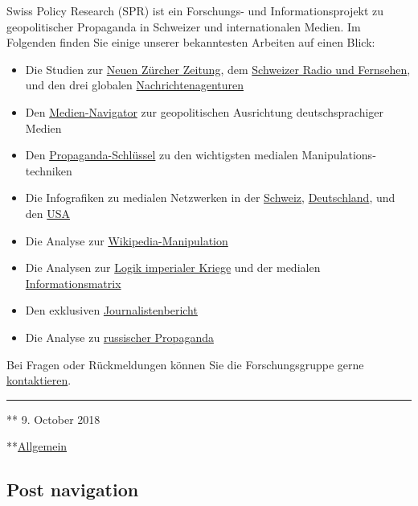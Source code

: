 Swiss Policy Research (SPR) ist ein Forschungs- und Informationsprojekt
zu geopolitischer Propaganda in Schweizer und internationalen Medien. Im
Folgenden finden Sie einige unserer bekanntesten Arbeiten auf einen
Blick:

\begin{itemize}
\tightlist
\item
  Die Studien zur \href{https://swprs.org/die-nzz-studie/}{Neuen Zürcher
  Zeitung}, dem
  \href{https://swprs.org/srf-propaganda-analyse/}{Schweizer Radio und
  Fernsehen}, und den drei globalen
  \href{https://swprs.org/der-propaganda-multiplikator/}{Nachrichtenagenturen}
\item
  Den \href{https://swprs.org/medien-navigator/}{Medien-Navigator} zur
  geopolitischen Ausrichtung deutschsprachiger Medien
\item
  Den
  \href{https://swprs.org/der-propaganda-schluessel/}{Propaganda-Schlüssel}
  zu den wich­tig­sten medialen Manipulations­techniken
\item
  Die Infografiken zu medialen Netzwerken in der
  \href{https://swprs.org/netzwerk-medien-schweiz/}{Schweiz},
  \href{https://swprs.org/netzwerk-medien-deutschland/}{Deutschland},
  und den
  \href{https://swprs.org/das-american-empire-und-seine-medien/}{USA}
\item
  Die Analyse zur
  \href{https://swprs.org/propaganda-in-der-wikipedia/}{Wikipedia-Manipulation}
\item
  Die Analysen zur
  \href{https://swprs.org/logik-imperialer-kriege/}{Logik imperialer
  Kriege} und der medialen
  \href{https://swprs.org/die-propaganda-matrix/}{Informationsmatrix}
\item
  Den exklusiven
  \href{https://swprs.org/bericht-eines-journalisten/}{Journalistenbericht}
\item
  Die Analyse zu
  \href{https://swprs.org/russische-propaganda/}{russischer Propaganda}
\end{itemize}

Bei Fragen oder Rückmeldungen können Sie die Forschungsgruppe gerne
\href{https://swprs.org/kontakt/}{kontaktieren}.

\begin{center}\rule{0.5\linewidth}{\linethickness}\end{center}

** 9. October 2018

**\href{https://swprs.org/category/allgemein/}{Allgemein}

\hypertarget{post-navigation}{%
\subsection{Post navigation}\label{post-navigation}}

